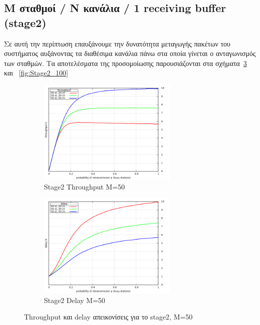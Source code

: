 \documentclass[12pt]{report}
\begin{document}
\subsection{\textlatin{M} σταθμοί / \textlatin{N} κανάλια / 1 \textlatin{receiving buffer} (\textlatin{stage2})}
Σε αυτή την περίπτωση επαυξάνουμε την δυνατότητα μεταγωγής πακέτων του συστήματος αυξάνοντας τα διαθέσιμα κανάλια πάνω στα οποία γίνεται ο ανταγωνισμός των σταθμών. Τα αποτελέσματα της προσομοίωσης παρουσιάζονται στα σχήματα~\ref{fig:Stage2_50} και ~\ref{fig:Stage2_100}
\begin{figure}[h]
\begin{subfigure}{0.5\textwidth}
\includegraphics[width=0.9\linewidth, height=5cm]{st2_throughput_M50} 
\caption{\textlatin{Stage2 Throughput M=50}}
\label{fig:st2_throughput_50}
\end{subfigure}
\begin{subfigure}{0.5\textwidth}
\includegraphics[width=0.9\linewidth, height=5cm]{st2_delay_M50}
\caption{\textlatin{Stage2 Delay M=50}}
\label{fig:st2_delay_50}
\end{subfigure}
 
\caption{\textlatin{Throughput} και \textlatin{delay} απεικονίσεις για το \textlatin{stage2}, M=50}
\label{fig:Stage2_50}
\end{figure}
\end{document}

